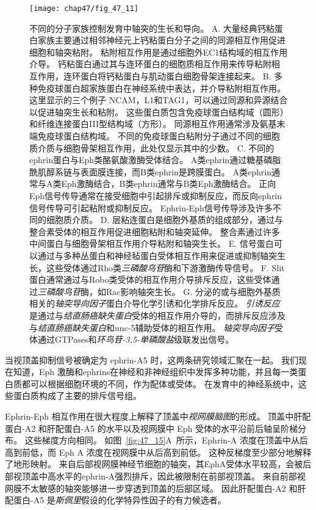 \begin{figure}[htbp]
	\centering
	\texttt{[image: chap47/fig\_47\_11]}
	\caption{不同的分子家族控制发育中轴突的生长和导向。
		A. 大量经典钙粘蛋白家族主要通过相邻神经元上钙粘蛋白分子之间的同源相互作用促进细胞和轴突粘附。
		粘附相互作用是通过细胞外EC1结构域的相互作用介导。
		钙粘蛋白通过其与连环蛋白的细胞质相互作用来传导粘附相互作用，连环蛋白将钙粘蛋白与肌动蛋白细胞骨架连接起来。
		B. 多种免疫球蛋白超家族蛋白在神经系统中表达，并介导粘附相互作用。
		这里显示的三个例子 NCAM，L1和TAG1，可以通过同源和异源结合以促进轴突生长和粘附。
		这些蛋白质包含免疫球蛋白结构域（圆形）和纤维连接蛋白III型结构域（方形）。
		同源相互作用通常涉及氨基末端免疫球蛋白结构域。
		不同的免疫球蛋白粘附分子通过不同的细胞质介质与细胞骨架相互作用，此处仅显示其中的少数。
		C. 不同的ephrin蛋白与Eph类酪氨酸激酶受体结合。
		A类ephrin通过糖基磷脂酰肌醇系链与表面膜连接，而B类ephrin是跨膜蛋白。
		A类ephrin通常与A类Eph激酶结合，B类ephrin通常与B类Eph激酶结合。
		正向Eph信号传导通常在接受细胞中引起排斥或抑制反应，而反向ephrin信号传导可引起粘附或抑制反应。
		Ephrin-Eph信号传导涉及许多不同的细胞质介质。
		D. 层粘连蛋白是细胞外基质的组成部分，通过与整合素受体的相互作用促进细胞粘附和轴突延伸。
		整合素通过许多中间蛋白与细胞骨架相互作用介导粘附和轴突生长。
		E. 信号蛋白可以通过与多种丛蛋白和神经毡蛋白受体相互作用来促进或抑制轴突生长，这些受体通过Rho类\textit{三磷酸鸟苷}酶和下游激酶传导信号。
		F. Slit蛋白通常通过与Robo类受体的相互作用介导排斥反应，这些受体通过\textit{三磷酸鸟苷}酶，如Rac影响轴突生长。
		G. 分泌的或与细胞外基质相关的\textit{轴突导向因子}蛋白介导化学引诱和化学排斥反应。
		\textit{引诱反应}是通过与\textit{结直肠癌缺失蛋白}受体的相互作用介导的，而排斥反应涉及与\textit{结直肠癌缺失蛋白}和unc-5辅助受体的相互作用。
		\textit{轴突导向因子}受体通过GTPases和\textit{环鸟苷-3,5-单磷酸盐}级联发出信号。}
	\label{fig:47_11}
\end{figure}


当视顶盖抑制信号被确定为 ephrin-A5 时，这两条研究领域汇聚在一起。
我们现在知道，Eph 激酶和ephrins在神经和非神经组织中发挥多种功能，并且每一类蛋白质都可以根据细胞环境的不同，作为配体或受体。
在发育中的神经系统中，这些蛋白质构成了主要的排斥信号组。


Ephrin-Eph 相互作用在很大程度上解释了顶盖中\textit{视网膜脑图}的形成。
顶盖中肝配蛋白-A2 和肝配蛋白-A5 的水平以及视网膜中 Eph 受体的水平沿前后轴呈阶梯分布。
这些梯度方向相同。
如图~\ref{fig:47_15}A~所示，Ephrin-A 浓度在顶盖中从后高到前低，而 Eph A 浓度在视网膜中从后高到前低。
这种反梯度至少部分地解释了地形映射。
来自后部视网膜神经节细胞的轴突，其EphA受体水平较高，会被后部视顶盖中高水平的ephrin-A强烈排斥，因此被限制在前部视顶盖。
来自前部视网膜不太敏感的轴突能够进一步穿透到顶盖的后部区域。
因此肝配蛋白-A2 和肝配蛋白-A5 是\textit{斯佩里}假设的化学特异性因子的有力候选者。


